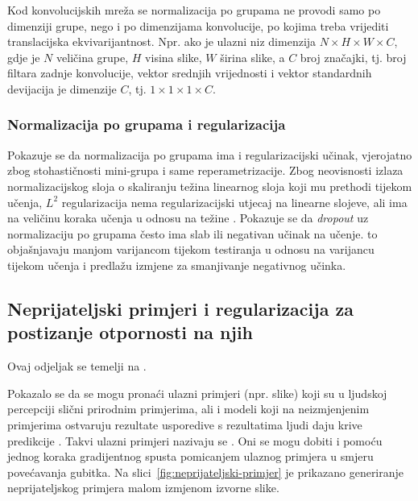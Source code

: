 \documentclass[utf8, diplomski, lmodern]{fer}
\begin{document}
Kod konvolucijskih mreža se normalizacija po grupama ne provodi samo po dimenziji grupe, nego i po dimenzijama konvolucije, po kojima treba vrijediti translacijska ekvivarijantnost. Npr. ako je ulazni niz dimenzija $N\times H\times W\times C$, gdje je $N$ veličina grupe, $H$ visina slike, $W$ širina slike, a $C$ broj značajki, tj. broj filtara zadnje konvolucije, vektor srednjih vrijednosti i vektor standardnih devijacija je dimenzije $C$, tj. $1\times 1\times 1\times C$.

\subsubsection{Normalizacija po grupama i regularizacija}

Pokazuje se da normalizacija po grupama ima i regularizacijski učinak, vjerojatno zbog stohastičnosti mini-grupa i same reperametrizacije. Zbog neovisnosti izlaza normalizacijskog sloja o skaliranju težina linearnog sloja koji mu prethodi tijekom učenja, $L^2$ regularizacija nema regularizacijski utjecaj na linearne slojeve, ali ima na veličinu koraka učenja u odnosu na težine \citep{Twan:2017:LRBWN}. Pokazuje se da \textit{dropout} uz normalizaciju po grupama često ima slab ili negativan učinak na učenje. \cite{Xiang:2018:UDBDBNVS} to objašnjavaju manjom varijancom tijekom testiranja u odnosu na varijancu tijekom učenja i predlažu izmjene za smanjivanje negativnog učinka.


\subsection{Neprijateljski primjeri i regularizacija za postizanje otpornosti na njih}

Ovaj odjeljak se temelji na \cite{Grubisic:2018:IPM}.
 
Pokazalo se da se mogu pronaći ulazni primjeri (npr. slike) koji su u ljudskoj percepciji slični prirodnim primjerima, ali i modeli koji na neizmjenjenim primjerima ostvaruju rezultate usporedive s rezultatima ljudi daju krive predikcije \citep{Szegedy:2013:IPNN,Goodfellow:2014:EHAE}. Takvi ulazni primjeri nazivaju se . Oni se mogu dobiti i pomoću jednog koraka gradijentnog spusta pomicanjem ulaznog primjera u smjeru povećavanja gubitka. Na slici~\ref{fig:neprijateljski-primjer} je prikazano generiranje neprijateljskog primjera malom izmjenom izvorne slike.
\end{document}
